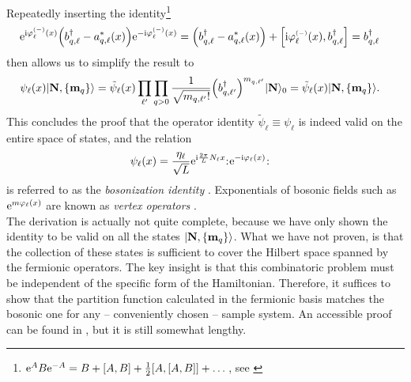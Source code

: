 Repeatedly inserting the identity\footnote{$\powe{A}B\powe{-A} = B + \klb*{A,B} + \frac{1}{2} \klb*{A, \klb*{A,B}} + \dots$, see \cite[]{Bosonization_DelftSchoeller_1998}}
\begin{align*}
\powe{\i\varphi_\ell\eminus(x)} \kla*{b_{q,\ell}^\dagger - a_{q,\ell}^\ast(x)} \powe{-\i\varphi_\ell\eminus(x)} &= \kla*{b_{q,\ell}^\dagger - a_{q,\ell}^\ast(x)} + \klb*{\i\varphi_\ell\eminus(x), b_{q,\ell}^\dagger} = b_{q,\ell}^\dagger
\end{align*}
then allows us to simplify the result to
\begin{align*}
\psi_\ell(x) \Ket{\textbf{N},\klc*{\textbf{m}_q}} &= \tilde{\psi}_\ell(x) \prod_{\ell'} \prod_{q> 0} \frac{1}{\sqrt{m_{q,\ell'}!}} \kla*{b_{q,\ell'}^\dagger}^{m_{q,\ell'}} \Ket{\textbf{N}}_0 = \tilde{\psi}_\ell(x) \Ket{\textbf{N}, \klc*{\textbf{m}_q}}.
\end{align*}
This concludes the proof that the operator identity $\tilde{\psi}_\ell \equiv \psi_\ell$ is indeed valid on the entire space of states, and the relation
\begin{align}
\psi_\ell(x) &= \frac{\eta_\ell}{\sqrt{L}} \powe{\i \frac{2\pi}{L} N_\ell x} \normord{\powe{-\i\varphi_\ell(x)}} \label{eqn:bos:bosonization identity}
\end{align}
is referred to as the \emph{bosonization identity} \cite{Giamarchi_2004,FermiLiquid_LL_review_Voit_1995,Bosonization_DelftSchoeller_1998}.
Exponentials of bosonic fields such as $\powe{m\varphi_\ell(x)}$ are known as \emph{vertex operators} \cite[]{Bosonization_DelftSchoeller_1998}.\\
The derivation is actually not quite complete, because we have only shown the identity to be valid on all the states $\Ket{\textbf{N}, \klc*{\textbf{m}_q}}$.
What we have not proven, is that the collection of these states is sufficient to cover the Hilbert space spanned by the fermionic operators.
The key insight is that this combinatoric problem must be independent of the specific form of the Hamiltonian.
Therefore, it suffices to show that the partition function calculated in the fermionic basis matches the bosonic one for any -- conveniently chosen -- sample system.
An accessible proof can be found in \cites[\sapp B]{Giamarchi_2004}[\sapp B]{Bosonization_DelftSchoeller_1998}, but it is still somewhat lengthy.%
